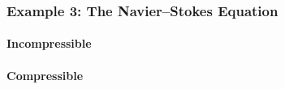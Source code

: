 \subsubsection{Example 3: The Navier–Stokes Equation}
    \paragraph{Incompressible}
    \paragraph{Compressible}
    